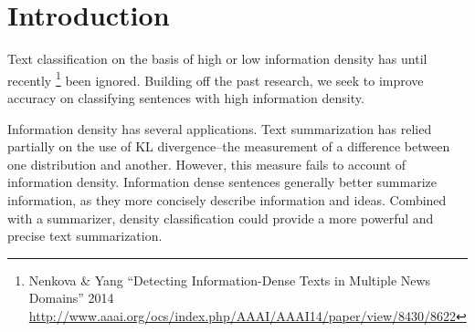 \documentclass[
10pt, %
a4paper, %
oneside, %
headinclude,footinclude, %
BCOR5mm, %
]{scrartcl}
\title{\normalfont\spacedallcaps{CIS530 Final Report}}
\author{\spacedlowsmallcaps{Stuart Wagner \& Michael Woods}}
\date{}
\begin{document}

\renewcommand{\sectionmark}[1]{\markright{\spacedlowsmallcaps{#1}}} %
\lehead{\mbox{\llap{\small\thepage\kern1em\color{halfgray} \vline}\color{halfgray}\hspace{0.5em}\rightmark\hfil}} %

\pagestyle{scrheadings} %


\maketitle

\setcounter{tocdepth}{2}

\tableofcontents %


\section{Introduction}

Text classification on the basis of high or low information density has until
recently
\footnote{Nenkova \& Yang ``Detecting Information-Dense Texts in Multiple News Domains'' 2014 
\url{http://www.aaai.org/ocs/index.php/AAAI/AAAI14/paper/view/8430/8622}} 
been ignored. Building off the past research, we
seek to improve accuracy on classifying sentences with high information density.

Information density has several applications. Text summarization has relied
partially on the use of KL divergence--the measurement of a difference between
one distribution and another. However, this measure fails to account of
information density. Information dense sentences generally better summarize
information, as they more concisely describe information and ideas. Combined
with a summarizer, density classification could provide a more powerful and
precise text summarization.
\end{document}
